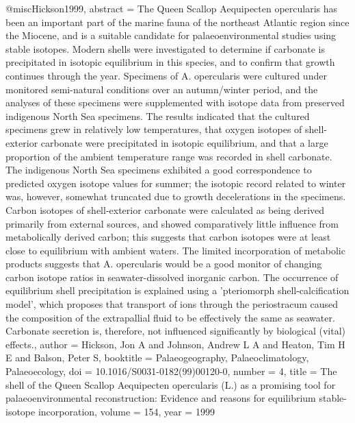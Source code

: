 @misc{Hickson1999,
abstract = {The Queen Scallop Aequipecten opercularis has been an important part of the marine fauna of the northeast Atlantic region since the Miocene, and is a suitable candidate for palaeoenvironmental studies using stable isotopes. Modern shells were investigated to determine if carbonate is precipitated in isotopic equilibrium in this species, and to confirm that growth continues through the year. Specimens of A. opercularis were cultured under monitored semi-natural conditions over an autumn/winter period, and the analyses of these specimens were supplemented with isotope data from preserved indigenous North Sea specimens. The results indicated that the cultured specimens grew in relatively low temperatures, that oxygen isotopes of shell-exterior carbonate were precipitated in isotopic equilibrium, and that a large proportion of the ambient temperature range was recorded in shell carbonate. The indigenous North Sea specimens exhibited a good correspondence to predicted oxygen isotope values for summer; the isotopic record related to winter was, however, somewhat truncated due to growth decelerations in the specimens. Carbon isotopes of shell-exterior carbonate were calculated as being derived primarily from external sources, and showed comparatively little influence from metabolically derived carbon; this suggests that carbon isotopes were at least close to equilibrium with ambient waters. The limited incorporation of metabolic products suggests that A. opercularis would be a good monitor of changing carbon isotope ratios in seawater-dissolved inorganic carbon. The occurrence of equilibrium shell precipitation is explained using a 'pteriomorph shell-calcification model', which proposes that transport of ions through the periostracum caused the composition of the extrapallial fluid to be effectively the same as seawater. Carbonate secretion is, therefore, not influenced significantly by biological (vital) effects.},
author = {Hickson, Jon A and Johnson, Andrew L A and Heaton, Tim H E and Balson, Peter S},
booktitle = {Palaeogeography, Palaeoclimatology, Palaeoecology},
doi = {10.1016/S0031-0182(99)00120-0},
number = {4},
title = {{The shell of the Queen Scallop Aequipecten opercularis (L.) as a promising tool for palaeoenvironmental reconstruction: Evidence and reasons for equilibrium stable-isotope incorporation}},
volume = {154},
year = {1999}
}
